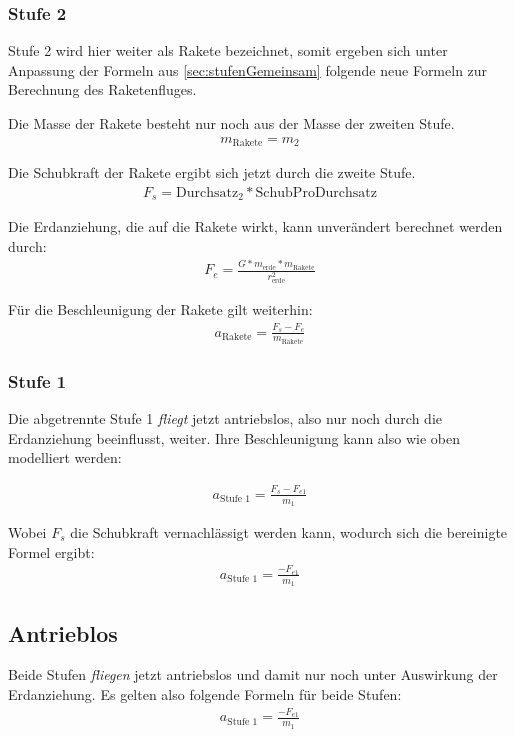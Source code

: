 \documentclass[10pt]{scrartcl}
\begin{document}
	\subsubsection{Stufe 2}
	Stufe 2 wird hier weiter als Rakete bezeichnet, somit ergeben sich unter Anpassung der Formeln aus \ref{sec:stufenGemeinsam} folgende neue Formeln zur Berechnung des Raketenfluges.
	
	Die Masse der Rakete besteht nur noch aus der Masse der zweiten Stufe.
	\begin{align} 
	m_{\text{Rakete}} = m_2
	\end{align}

	Die Schubkraft der Rakete ergibt sich jetzt durch die zweite Stufe.
	\begin{align}
	F_s = \text{Durchsatz}_2 * \text{SchubProDurchsatz}
	\end{align}

	Die Erdanziehung, die auf die Rakete wirkt, kann unverändert berechnet werden durch:
	\begin{align}
	F_e = \frac{G * m_{\text{erde}} * m_{\text{Rakete}}}{r_{\text{erde}}^2}
	\end{align}
	
	Für die Beschleunigung der Rakete gilt weiterhin:
	\begin{align}
	a_{\text{Rakete}} = \frac{F_s - F_e}{m_{\text{Rakete}}}
	\end{align}	
	
	\subsubsection{Stufe 1}
	Die abgetrennte Stufe 1 \textit{fliegt} jetzt antriebslos, also nur noch durch die Erdanziehung beeinflusst, weiter.
	Ihre Beschleunigung kann also wie oben modelliert werden: 
	
	\begin{align}
	a_{\text{Stufe 1}} = \frac{F_s - F_{e1}}{m_1}
	\end{align}		
	
	Wobei $F_s$ die Schubkraft vernachlässigt werden kann, wodurch sich die bereinigte Formel ergibt:
	\begin{align}
	a_{\text{Stufe 1}} = \frac{- F_{e1}}{m_1}
	\end{align}			
	
	
	
	\subsection{Antrieblos}
	Beide Stufen \textit{fliegen} jetzt antriebslos und damit nur noch unter Auswirkung der Erdanziehung.
	Es gelten also folgende Formeln für beide Stufen:
	\begin{align}
	a_{\text{Stufe 1}} = \frac{- F_{e1}}{m_1}
	\end{align}	
	
\end{document}
